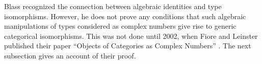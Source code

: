 \documentclass{msthesis}
\theoremstyle{definition}
\begin{document}
Blass recognized the connection between algebraic identities and type isomorphisms.  However, he does not prove any conditions that such algebraic manipulations of types considered as complex numbers give rise to generic categorical isomorphisms.  This was not done until 2002, when Fiore and Leinster published their paper ``Objects of Categories as Complex Numbers'' \cite{Fiore2005}.  The next subsection gives an account of their proof.




\end{document}
